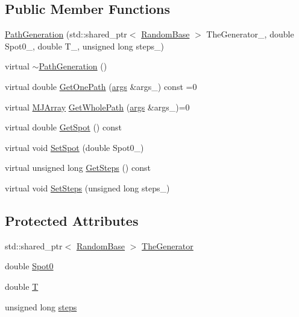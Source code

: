 \subsection*{Public Member Functions}
\begin{DoxyCompactItemize}
\item 
\hyperlink{classPathGeneration_ac8b6d80fa6fb84c11e66f1546963ba16}{Path\+Generation} (std\+::shared\+\_\+ptr$<$ \hyperlink{classRandomBase}{Random\+Base} $>$ The\+Generator\+\_\+, double Spot0\+\_\+, double T\+\_\+, unsigned long steps\+\_)
\item 
virtual \hyperlink{classPathGeneration_a2677068f680c321802258f97403c008f}{$\sim$\+Path\+Generation} ()
\item 
virtual double \hyperlink{classPathGeneration_a9a64a37f4dd9b2b3ef84f3cb66aed843}{Get\+One\+Path} (\hyperlink{path__generation_8h_a75c13cde2074f502cc4348c70528572d}{args} \&args\+\_\+) const =0
\item 
virtual \hyperlink{classMJArray}{M\+J\+Array} \hyperlink{classPathGeneration_ace7520fed7b6a7711f4d3684c974cb76}{Get\+Whole\+Path} (\hyperlink{path__generation_8h_a75c13cde2074f502cc4348c70528572d}{args} \&args\+\_\+)=0
\item 
virtual double \hyperlink{classPathGeneration_a53f386b51d74fb8e100e18cf904ef801}{Get\+Spot} () const
\item 
virtual void \hyperlink{classPathGeneration_a5e3349bb16f3d5eb0a3d059572bfe3c8}{Set\+Spot} (double Spot0\+\_\+)
\item 
virtual unsigned long \hyperlink{classPathGeneration_a7a7ad14af906f2282663ac78d7b21706}{Get\+Steps} () const
\item 
virtual void \hyperlink{classPathGeneration_afc14af2b771829ca2581463e4e4c1213}{Set\+Steps} (unsigned long steps\+\_\+)
\end{DoxyCompactItemize}
\subsection*{Protected Attributes}
\begin{DoxyCompactItemize}
\item 
std\+::shared\+\_\+ptr$<$ \hyperlink{classRandomBase}{Random\+Base} $>$ \hyperlink{classPathGeneration_abc5192a7165581ac6943ad4672a0cbd8}{The\+Generator}
\item 
double \hyperlink{classPathGeneration_ae476651fa3c08266b79c5e20726c0c67}{Spot0}
\item 
double \hyperlink{classPathGeneration_a5c62e982138106c6846600a2f484d6d3}{T}
\item 
unsigned long \hyperlink{classPathGeneration_acd3ff6bbb1c24794ccc0f39277c671a9}{steps}
\end{DoxyCompactItemize}


